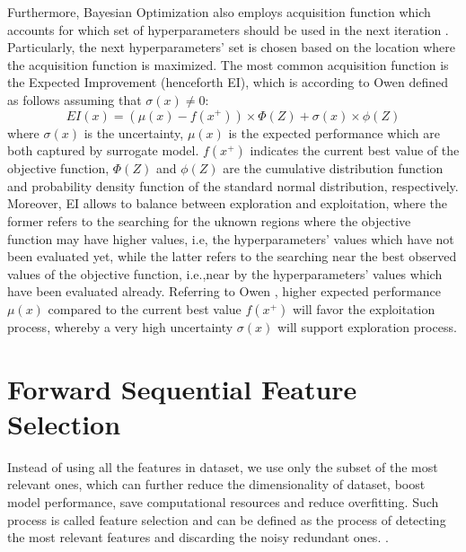 Furthermore, Bayesian Optimization also employs acquisition function which accounts for which set of hyperparameters should be used in the next iteration \citep{owen2022hyperparameter}. Particularly, the next hyperparameters' set is chosen based on the location where the acquisition function is maximized.
The most common acquisition function is the Expected Improvement (henceforth EI), which is according to Owen \citep{owen2022hyperparameter} defined as follows assuming that $ \sigma\left(x\right) \neq 0$:
\begin{equation}\label{eq}
    EI(x) = \left(\mu\left(x\right) - f\left(x^{+}\right)\right) \times \Phi\left(Z\right) + \sigma\left(x\right) \times \phi\left(Z\right)
\end{equation}
where $\sigma\left(x\right)$ is the uncertainty, $\mu\left(x\right)$ is the expected performance which are both captured by surrogate model. $f\left(x^{+}\right)$ indicates the current best value of the objective function, $\Phi\left(Z\right)$ and $\phi\left(Z\right)$ are the cumulative distribution function and probability density function of the standard normal distribution, respectively.
Moreover, EI allows to balance between exploration and exploitation, where the former refers to the searching for the uknown regions where the objective function may have higher values, i.e, the hyperparameters' values which have not been evaluated yet, while the latter refers to the searching near the best observed values of the objective function, i.e.,near by the hyperparameters' values which have been evaluated already.
Referring to Owen \citep{owen2022hyperparameter}, higher expected performance $\mu\left(x\right)$ compared to the current best value $f\left(x^{+}\right)$ will favor the exploitation process, whereby a very high uncertainty $\sigma\left(x\right)$ will support exploration process.

\section{Forward Sequential Feature Selection}
\label{sec:fsfstheory}
Instead of using all the features in dataset, we use only the subset of the most relevant ones, which can further reduce the dimensionality of dataset, boost model performance, save computational resources and reduce overfitting. Such process is called feature selection and can be defined as the process of detecting the most relevant features and discarding the noisy redundant ones. \citep{bolon2015feature}.

